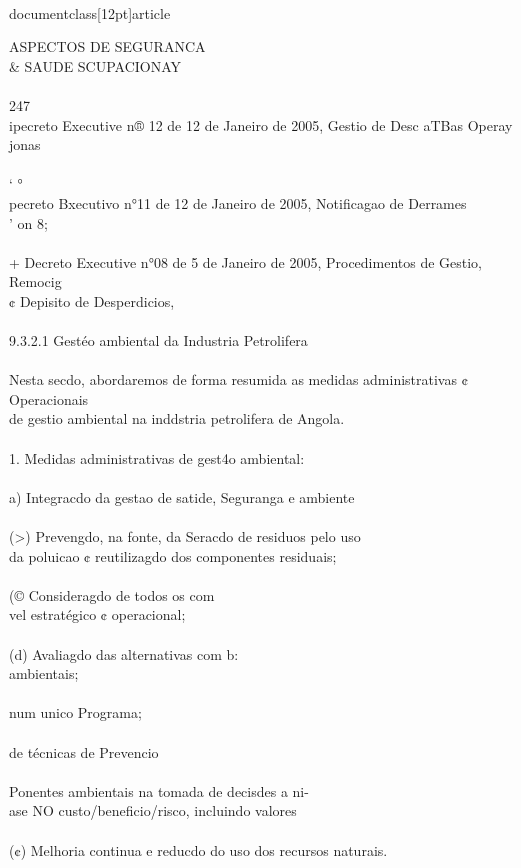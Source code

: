 \\documentclass[12pt]{article}
\begin{document}
{{{{ASPECTOS DE SEGURANCA \\& SAUDE SCUPACIONAY\\
\\
247\\
ipecreto Executive n® 12 de 12 de Janeiro de 2005, Gestio de Desc aTBas Operay jonas\\
\\
‘ °\\
pecreto Bxecutivo n°11 de 12 de Janeiro de 2005, Notificagao de Derrames\\
’ on 8;\\
\\
+ Decreto Executive n°08 de 5 de Janeiro de 2005, Procedimentos de Gestio, Remocig\\
¢ Depisito de Desperdicios,\\
\\
9.3.2.1 Gestéo ambiental da Industria Petrolifera\\
\\
Nesta secdo, abordaremos de forma resumida as medidas administrativas ¢ Operacionais\\
de gestio ambiental na inddstria petrolifera de Angola.\\
\\
1. Medidas administrativas de gest4o ambiental:\\
\\
a) Integracdo da gestao de satide, Seguranga e ambiente\\
\\
(>) Prevengdo, na fonte, da Seracdo de residuos pelo uso\\
da poluicao ¢ reutilizagdo dos componentes residuais;\\
\\
(© Consideragdo de todos os com\\
vel estratégico ¢ operacional;\\
\\
(d) Avaliagdo das alternativas com b:\\
ambientais;\\
\\
num unico Programa;\\
\\
de técnicas de Prevencio\\
\\
Ponentes ambientais na tomada de decisdes a ni-\\
ase NO custo/beneficio/risco, incluindo valores\\
\\
(¢) Melhoria continua e reducdo do uso dos recursos naturais.\\
}}}}
\end{document}
